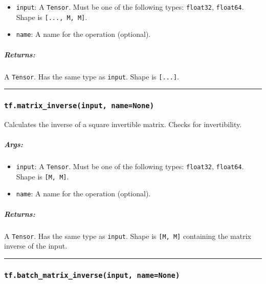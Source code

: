 \begin{itemize}
\tightlist
\item
  \texttt{input}: A \texttt{Tensor}. Must be one of the following types:
  \texttt{float32}, \texttt{float64}. Shape is
  \texttt{{[}...,\ M,\ M{]}}.
\item
  \texttt{name}: A name for the operation (optional).
\end{itemize}

\subparagraph{Returns: }\label{returns-28}

A \texttt{Tensor}. Has the same type as \texttt{input}. Shape is
\texttt{{[}...{]}}.

\begin{center}\rule{0.5\linewidth}{\linethickness}\end{center}

\subsubsection{\texorpdfstring{\texttt{tf.matrix\_inverse(input,\ name=None)}
}{tf.matrix\_inverse(input, name=None) }}\label{tf.matrixux5finverseinput-namenone}

Calculates the inverse of a square invertible matrix. Checks for
invertibility.

\subparagraph{Args: }\label{args-29}

\begin{itemize}
\tightlist
\item
  \texttt{input}: A \texttt{Tensor}. Must be one of the following types:
  \texttt{float32}, \texttt{float64}. Shape is \texttt{{[}M,\ M{]}}.
\item
  \texttt{name}: A name for the operation (optional).
\end{itemize}

\subparagraph{Returns: }\label{returns-29}

A \texttt{Tensor}. Has the same type as \texttt{input}. Shape is
\texttt{{[}M,\ M{]}} containing the matrix inverse of the input.

\begin{center}\rule{0.5\linewidth}{\linethickness}\end{center}

\subsubsection{\texorpdfstring{\texttt{tf.batch\_matrix\_inverse(input,\ name=None)}
}{tf.batch\_matrix\_inverse(input, name=None) }}\label{tf.batchux5fmatrixux5finverseinput-namenone}

